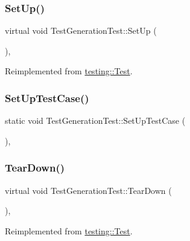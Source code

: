 \subsubsection{\texorpdfstring{SetUp()}{SetUp()}}
{\footnotesize\ttfamily virtual void Test\+Generation\+Test\+::\+Set\+Up (\begin{DoxyParamCaption}{ }\end{DoxyParamCaption})\hspace{0.3cm}{\ttfamily [inline]}, {\ttfamily [virtual]}}



Reimplemented from \mbox{\hyperlink{classtesting_1_1Test_a190315150c303ddf801313fd1a777733}{testing\+::\+Test}}.

\mbox{\label{classTestGenerationTest_a3e1681e93e14b17fe923e763d88940cb}} 
\subsubsection{\texorpdfstring{SetUpTestCase()}{SetUpTestCase()}}
{\footnotesize\ttfamily static void Test\+Generation\+Test\+::\+Set\+Up\+Test\+Case (\begin{DoxyParamCaption}{ }\end{DoxyParamCaption})\hspace{0.3cm}{\ttfamily [inline]}, {\ttfamily [static]}}

\mbox{\label{classTestGenerationTest_a447190a74b306b4b94c25fed474d6029}} 
\subsubsection{\texorpdfstring{TearDown()}{TearDown()}}
{\footnotesize\ttfamily virtual void Test\+Generation\+Test\+::\+Tear\+Down (\begin{DoxyParamCaption}{ }\end{DoxyParamCaption})\hspace{0.3cm}{\ttfamily [inline]}, {\ttfamily [virtual]}}



Reimplemented from \mbox{\hyperlink{classtesting_1_1Test_a5f0ab439802cbe0ef7552f1a9f791923}{testing\+::\+Test}}.

